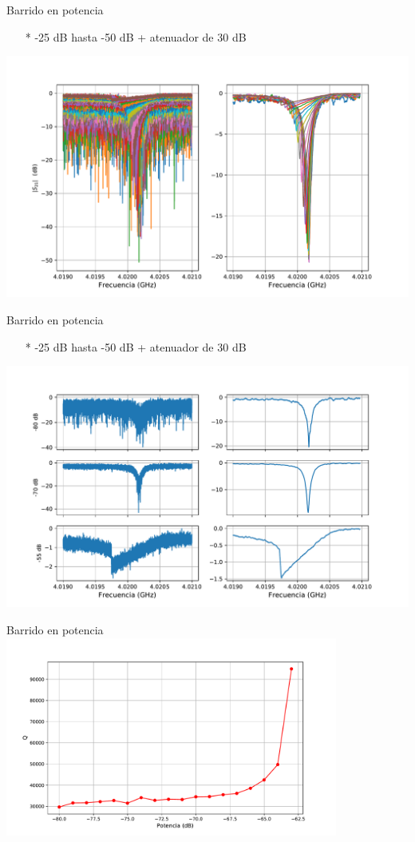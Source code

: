 \documentclass[ignorenonframetext,12pt]{beamer}
\begin{document}
\begin{frame}{Barrido en potencia}
				\begin{itemize}
								\item[*] -25 dB hasta -50 dB + atenuador de 30 dB
				\end{itemize}
				\centering
												\includegraphics[width=\textwidth]{res0_asc_full_potencias}
\end{frame}
\begin{frame}{Barrido en potencia}
				\begin{itemize}
								\item[*] -25 dB hasta -50 dB + atenuador de 30 dB
				\end{itemize}
				\centering
												\includegraphics[width=\textwidth]{res0_3_potencias}

\end{frame}
\begin{frame}{Barrido en potencia}
				\centering
												\includegraphics[width=0.82\textwidth]{res0_Q_vs_P}

\end{frame}
\end{document}
